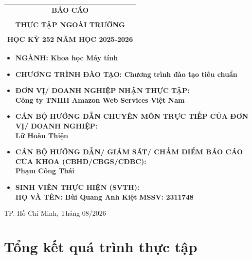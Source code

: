 \documentclass[a4paper]{article}
\theoremstyle{definition}
\begin{document}
\begin{titlepage}
\begin{center}
\begin{tabular}{c}
\multicolumn{1}{c}{\textbf{{\LARGE BÁO CÁO}}}\\
\\{\textbf{{\LARGE THỰC TẬP NGOÀI TRƯỜNG}}}
\\
\\
\textbf{\Large HỌC KỲ 252 NĂM HỌC 2025-2026} \\
\end{tabular}
\end{center}
\vspace{0.5cm}
\begin{itemize}
\renewcommand\labelitemi{--}
    \item \Large \textbf{NGÀNH: Khoa học Máy tính}
    \item \Large \textbf{CHƯƠNG TRÌNH ĐÀO TẠO: Chương trình đào tạo tiêu chuẩn}
\end{itemize}
\vspace{0.7cm}
\begin{itemize}
\renewcommand\labelitemi{--}
    \item \Large \textbf{ĐƠN VỊ/ DOANH NGHIỆP NHẬN THỰC TẬP:}
    \\ \Large \textbf{Công ty TNHH Amazon Web Services Việt Nam}
    \item \Large \textbf{CÁN BỘ HƯỚNG DẪN CHUYÊN MÔN TRỰC TIẾP CỦA ĐƠN VỊ/ DOANH NGHIỆP:}
    \\ \Large \textbf{Lữ Hoàn Thiện}
    \item \Large \textbf{CÁN BỘ HƯỚNG DẪN/ GIÁM SÁT/ CHẤM ĐIỂM BÁO CÁO CỦA KHOA (CBHD/CBGS/CĐBC):}
    \\ \Large \textbf{Phạm Công Thái}
    \item \Large \textbf{SINH VIÊN THỰC HIỆN (SVTH):}
    \\ \Large \textbf{HỌ VÀ TÊN: Bùi Quang Anh Kiệt} \textbf{MSSV: 2311748}
\end{itemize}
\vspace{0.5cm}
\begin{center}
{\Large TP. Hồ Chí Minh, Tháng 08/2026}
\end{center}
\end{titlepage}

\newpage
\tableofcontents
\newpage





\newpage
\section{Tổng kết quá trình thực tập}
% 
% 

\end{document}
